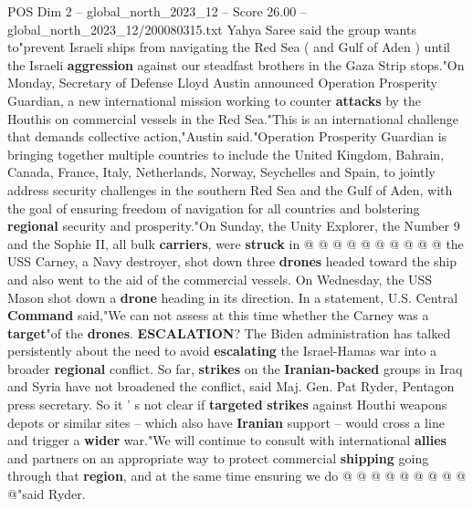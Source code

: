 \begin{textsample}{POS Dim 2 – global\_north\_2023\_12 – Score 26.00 – global\_north\_2023\_12/200080315.txt}
Yahya Saree said the group wants to"prevent Israeli ships from navigating the Red Sea ( and Gulf of Aden ) until the Israeli \textbf{aggression} against our steadfast brothers in the Gaza Strip stops."On Monday, Secretary of Defense Lloyd Austin announced Operation Prosperity Guardian, a new international mission working to counter \textbf{attacks} by the Houthis on commercial vessels in the Red Sea."This is an international challenge that demands collective action,"Austin said."Operation Prosperity Guardian is bringing together multiple countries to include the United Kingdom, Bahrain, Canada, France, Italy, Netherlands, Norway, Seychelles and Spain, to jointly address security challenges in the southern Red Sea and the Gulf of Aden, with the goal of ensuring freedom of navigation for all countries and bolstering \textbf{regional} security and prosperity."On Sunday, the Unity Explorer, the Number 9 and the Sophie II, all bulk \textbf{carriers}, were \textbf{struck} in @ @ @ @ @ @ @ @ @ @ the USS Carney, a Navy destroyer, shot down three \textbf{drones} headed toward the ship and also went to the aid of the commercial vessels.
On Wednesday, the USS Mason shot down a \textbf{drone} heading in its direction.
In a statement, U.S.
Central \textbf{Command} said,"We can not assess at this time whether the Carney was a \textbf{target}"of the \textbf{drones}. \textbf{ESCALATION}?
The Biden administration has talked persistently about the need to avoid \textbf{escalating} the Israel-Hamas war into a broader \textbf{regional} conflict.
So far, \textbf{strikes} on the \textbf{Iranian-backed} groups in Iraq and Syria have not broadened the conflict, said Maj.
Gen.
Pat Ryder, Pentagon press secretary.
So it ' s not clear if \textbf{targeted} \textbf{strikes} against Houthi weapons depots or similar sites -- which also have \textbf{Iranian} support -- would cross a line and trigger a \textbf{wider} war."We will continue to consult with international \textbf{allies} and partners on an appropriate way to protect commercial \textbf{shipping} going through that \textbf{region}, and at the same time ensuring we do @ @ @ @ @ @ @ @ @ @"said Ryder.

\end{textsample}
